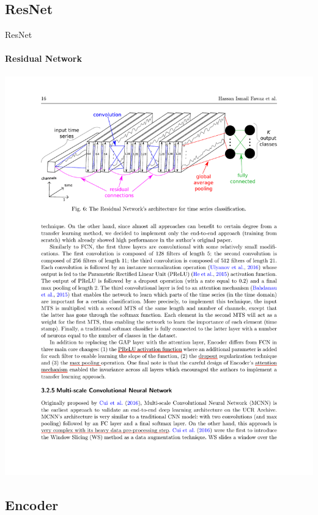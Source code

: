 \documentclass[aspectratio=169]{ctexbeamer}
\begin{document}
\subsection{ResNet}
\begin{frame}{ResNet}
 \framesubtitle{Residual Network}
 \begin{center}
 	\includegraphics[width=.8\textwidth]{figure/resnet}
 \end{center}
\end{frame}

\subsection{Encoder}
\end{document}
